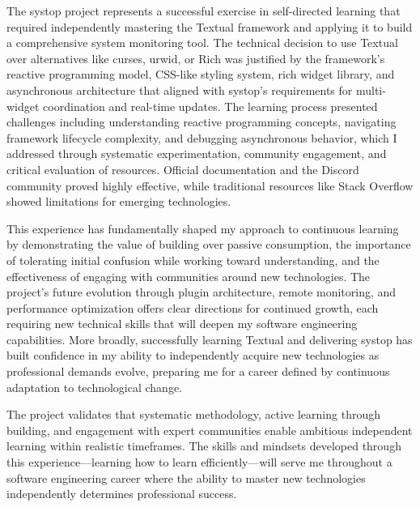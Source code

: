 \documentclass[12pt,a4paper]{article}
\begin{document}
The systop project represents a successful exercise in self-directed learning that required independently mastering the Textual framework and applying it to build a comprehensive system monitoring tool. The technical decision to use Textual over alternatives like curses, urwid, or Rich was justified by the framework's reactive programming model, CSS-like styling system, rich widget library, and asynchronous architecture that aligned with systop's requirements for multi-widget coordination and real-time updates. The learning process presented challenges including understanding reactive programming concepts, navigating framework lifecycle complexity, and debugging asynchronous behavior, which I addressed through systematic experimentation, community engagement, and critical evaluation of resources. Official documentation and the Discord community proved highly effective, while traditional resources like Stack Overflow showed limitations for emerging technologies.

This experience has fundamentally shaped my approach to continuous learning by demonstrating the value of building over passive consumption, the importance of tolerating initial confusion while working toward understanding, and the effectiveness of engaging with communities around new technologies. The project's future evolution through plugin architecture, remote monitoring, and performance optimization offers clear directions for continued growth, each requiring new technical skills that will deepen my software engineering capabilities. More broadly, successfully learning Textual and delivering systop has built confidence in my ability to independently acquire new technologies as professional demands evolve, preparing me for a career defined by continuous adaptation to technological change.

The project validates that systematic methodology, active learning through building, and engagement with expert communities enable ambitious independent learning within realistic timeframes. The skills and mindsets developed through this experience—learning how to learn efficiently—will serve me throughout a software engineering career where the ability to master new technologies independently determines professional success.
\end{document}
